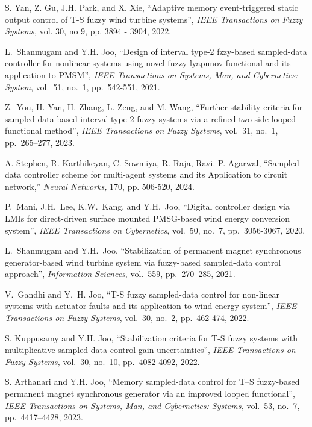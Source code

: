 \documentclass[preprint,11pt]{elsarticle}
\begin{document}
\begin{thebibliography}{00}
S. Yan, Z. Gu, J.H. Park, and X. Xie, ``Adaptive memory event-triggered static output control of T-S fuzzy wind turbine systems'', {\em IEEE
Transactions on Fuzzy Systems,} vol. 30, no 9, pp. 3894 - 3904, 2022.



L.~Shanmugam  and Y.H. Joo, ``Design of interval type-2 fzzy-based sampled-data controller for nonlinear systems using novel fuzzy lyapunov functional and its application to PMSM'', {\em  IEEE Transactions on Systems, Man, and Cybernetics: System}, vol.~51, no.~1,  pp.~542-551, 2021.

Z.~You, H. Yan, H. Zhang, L. Zeng, and M. Wang, ``Further stability criteria for sampled-data-based interval type-2 fuzzy systems via a refined two-side looped-functional method'', {\em   IEEE Transactions on Fuzzy Systems}, vol.~31, no.~1,  pp.~265--277, 2023.

A. Stephen, R. Karthikeyan, C. Sowmiya, R. Raja, Ravi. P. Agarwal, ``Sampled-data controller scheme for multi-agent systems and its Application to circuit network,'' {\em Neural Networks,} 170, pp. 506-520, 2024.

P.~Mani, J.H.~Lee, K.W.~Kang, and Y.H.~Joo, ``Digital controller design via LMIs for direct-driven surface mounted PMSG-based wind energy conversion system'', {\em IEEE Transactions on Cybernetics}, vol.~50, no.~7, pp.~3056-3067, 2020.

L.~Shanmugam and Y.H.~Joo, ``Stabilization of permanent magnet synchronous generator-based wind turbine system via fuzzy-based sampled-data control approach'', {\em Information Sciences}, vol.~559, pp.~270--285, 2021.

V.~Gandhi and Y.~H. Joo, ``T-S fuzzy sampled-data control for non-linear systems with actuator faults and its application to wind energy system'', {\em IEEE Transactions on Fuzzy Systems}, vol.~30, no.~2, pp.~462-474, 2022.

S.  Kuppusamy and Y.H. Joo, ``Stabilization criteria for T-S fuzzy systems with multiplicative sampled-data control gain uncertainties'', {\em IEEE Transactions on Fuzzy Systems,} vol.~30, no.~10, pp.~4082-4092, 2022.

{S. Arthanari and Y.H. Joo, ``Memory sampled-data control for T–S fuzzy-based permanent magnet synchronous generator via an improved looped functional'', {\em IEEE Transactions on Systems, Man, and Cybernetics: Systems,} vol.~53, no.~7, pp.~4417--4428, 2023.}



\end{thebibliography}
\end{document}
